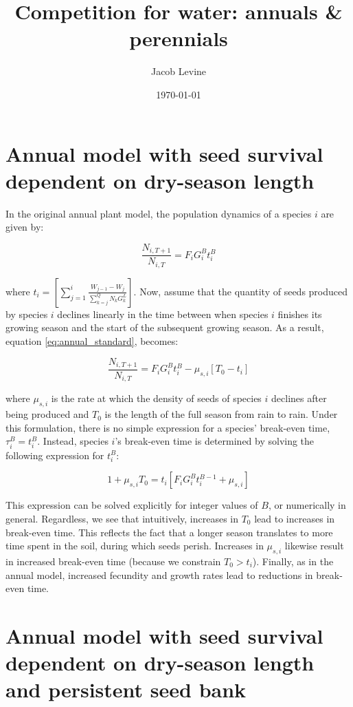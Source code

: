 \documentclass[11pt]{article}
\author{Jacob Levine}
\date{\today}
\title{Competition for water: annuals \& perennials}
\begin{document}
\maketitle

\section{Annual model with seed survival dependent on dry-season length}
\label{sec:org78cb216}

In the original annual plant model, the population dynamics of a species \(i\) are given by:

\begin{equation} \label{eq:annual_standard}
    \frac{N_{i,T+1}}{N_{i,T}} = F_i G_i^B t_i^B
\end{equation}

where \(t_i = \left[\sum_{j=1}^{i}\frac{ W_{j-1} - W_{j}}{\sum_{k=j}^Q N_{k}G_k^L} \right]\). Now, assume that the quantity of seeds produced by species \(i\) declines linearly in the time between when species \(i\) finishes its growing season and the start of the subsequent growing season. As a result, equation \ref{eq:annual_standard}, becomes:

\begin{equation} \label{annual_seedsurvival}
    \frac{N_{i,T+1}}{N_{i,T}} = F_i G_i^B t_i^B - \mu_{s,i} \left[T_0 - t_i\right]
\end{equation}

where \(\mu_{s,i}\) is the rate at which the density of seeds of species \(i\) declines after being produced and \(T_0\) is the length of the full season from rain to rain. Under this formulation, there is no simple expression for a species' break-even time, \(\tau_i^B = t_i^B\). Instead, species \(i\)'s break-even time is determined by solving the following expression for \(t_i^B\):

\begin{equation*}
    1 + \mu_{s,i} T_0 = t_i \left[ F_i G_i^B t_i^{B-1} + \mu_{s,i} \right]
\end{equation*}

This expression can be solved explicitly for integer values of \(B\), or numerically in general. Regardless, we see that intuitively, increases in \(T_0\) lead to increases in break-even time. This reflects the fact that a longer season translates to more time spent in the soil, during which seeds perish. Increases in \(\mu_{s,i}\) likewise result in increased break-even time (because we constrain \(T_0 > t_i\)). Finally, as in the annual model, increased fecundity and growth rates lead to reductions in break-even time.



\section{Annual model with seed survival dependent on dry-season length and persistent seed bank}
\label{sec:org05211a8}
\end{document}
